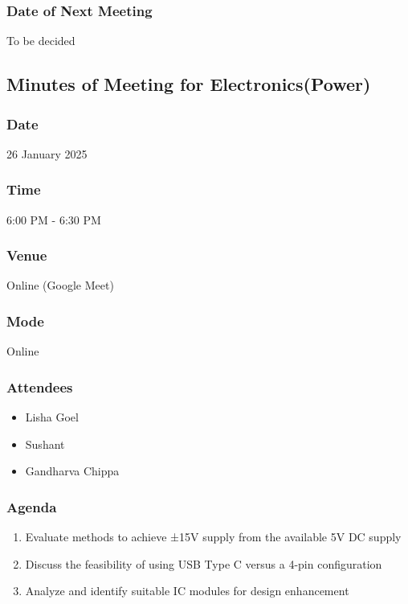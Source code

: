 \documentclass[12pt,a4paper]{article}
\begin{document}
\subsubsection*{Date of Next Meeting}
To be decided

\subsection*{Minutes of Meeting for Electronics(Power)}

\subsubsection*{Date}
26 January 2025

\subsubsection*{Time}
6:00 PM - 6:30 PM

\subsubsection*{Venue}
Online (Google Meet)

\subsubsection*{Mode}
Online

\subsubsection*{Attendees}
\begin{itemize}
    \item Lisha Goel
    \item Sushant
    \item Gandharva Chippa
\end{itemize}

\subsubsection*{Agenda}
\begin{enumerate}
    \item Evaluate methods to achieve ±15V supply from the available 5V DC supply
    \item Discuss the feasibility of using USB Type C versus a 4-pin configuration
    \item Analyze and identify suitable IC modules for design enhancement
\end{enumerate}
\end{document}
